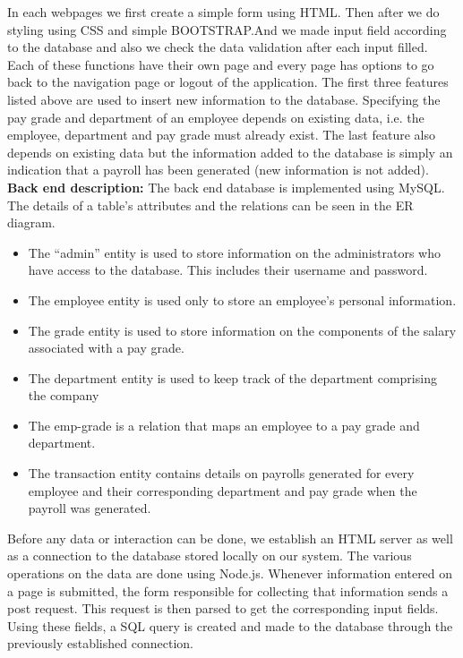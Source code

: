 \documentclass[12pt]{article}
\begin{document}
\newline  In each webpages we first create a simple form using HTML. Then after we do styling using CSS and simple BOOTSTRAP.And we made input field according to the database and also we check the data validation after each input filled.
Each of these functions have their own page and every page has options to go back to the navigation page or logout of the application.
\newline
\newline
The first three features listed above are used to insert new information to the database. Specifying the pay grade and department of an employee depends on existing data, i.e. the employee, department and pay grade must already exist. The last feature also depends on existing data but the information added to the database is simply an indication that a payroll has been generated (new information is not added).
\newpage
\noindent
\textbf{Back end description:}
\newline
\newline
The back end database is implemented using MySQL. The details of a table's attributes and the relations can be seen in the ER diagram.
\begin{itemize}
    \item The “admin” entity is used to store information on the administrators who have access to the database. This includes their username and password.
    \item The employee entity is used only to store an employee’s personal information.
    \item The grade entity is used to store information on the components of the salary associated with a pay grade.
    \item The department entity is used to keep track of the department comprising the company
    \item The emp-grade is a relation that maps an employee to a pay grade and department.
    \item The transaction entity contains details on payrolls generated for every employee and their corresponding department and pay grade when the payroll was generated.
\end{itemize}
Before any data or interaction can be done, we establish an HTML server as well as a connection to the database stored locally on our system. 
\newline
\newline
The various operations on the data are done using Node.js. Whenever information entered on a page is submitted, the form responsible for collecting that information sends a post request. This request is then parsed to get the corresponding input fields. Using these fields, a SQL query is created and made to the database through the previously established connection.
\end{document}
